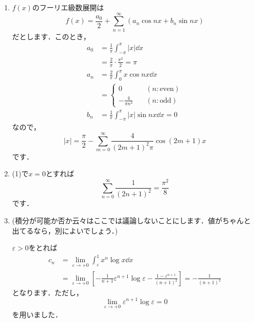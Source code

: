 \documentclass[a4paper,pdflatex,ja=standard]{bxjsarticle}
\begin{document}
\begin{enumerate}
  \item 
  $f(x)$のフーリエ級数展開は
  \begin{equation}
    f(x)
    =
    \frac{a_0}{2}
    +
    \sum_{n=1}^{\infty}
    (
      a_n \cos nx
      +
      b_n \sin nx
    )
  \end{equation}
  だとします．このとき，
  \begin{align}
    a_0
    &=
    \frac{1}{\pi}
    \int_{-\pi}^{\pi}
    |x|\dd x
    \nonumber
    \\
    &=
    \frac{2}{\pi}
    \cdot
    \frac{\pi^2}{2}
    =
    \pi
    \\
    a_n
    &=
    \frac{2}{\pi}
    \int_0^{\pi}
    x\cos nx
    \dd x
    \nonumber
    \\
    &=
    \left\{
      \begin{alignedat}{1}
        0
        &\quad
        (n:\text{even})
        \\
        -
        \frac{4}{\pi n^2}
        &\quad
        (n:\text{odd})
      \end{alignedat}
    \right.
    \\
    b_n
    &=
    \frac{1}{\pi}
    \int_{-\pi}^{\pi}
    |x|\sin nx
    \dd x
    =
    0
  \end{align}
  なので，
  \begin{equation}
    |x|
    =
    \frac{\pi}{2}
    -
    \sum_{m=0}^{\infty}
    \frac{4}{(2m+1)^2\pi}
    \cos (2m+1)x
  \end{equation}
  です．

  \item 
  (1)で$x=0$とすれば
  \begin{equation}
    \sum_{n=0}^{\infty}
    \frac{1}{(2n+1)^2}
    =
    \frac{\pi^2}{8}
  \end{equation}
  です．

  \item 
  (積分が可能か否か云々はここでは議論しないことにします．値がちゃんと出てるなら，別によいでしょう．)

  $\varepsilon>0$をとれば
  \begin{align}
    c_n
    &=
    \lim_{\varepsilon\rightarrow+0}
    \int_{\varepsilon}^{1}
    x^n\log x
    \dd x
    \nonumber
    \\
    &=
    \lim_{\varepsilon\rightarrow+0}
    \left[  
      -
      \frac{1}{n+1}\varepsilon^{n+1}\log\varepsilon
      -
      \frac{1-\varepsilon^{n+1}}{(n+1)^2}
    \right]
    =
    -
    \frac{1}{(n+1)^2}
  \end{align}
  となります．ただし，
  \begin{equation}
    \lim_{\varepsilon\rightarrow+0}\varepsilon^{n+1}\log\varepsilon
    =
    0
  \end{equation}
  を用いました．


\end{enumerate}
\end{document}
